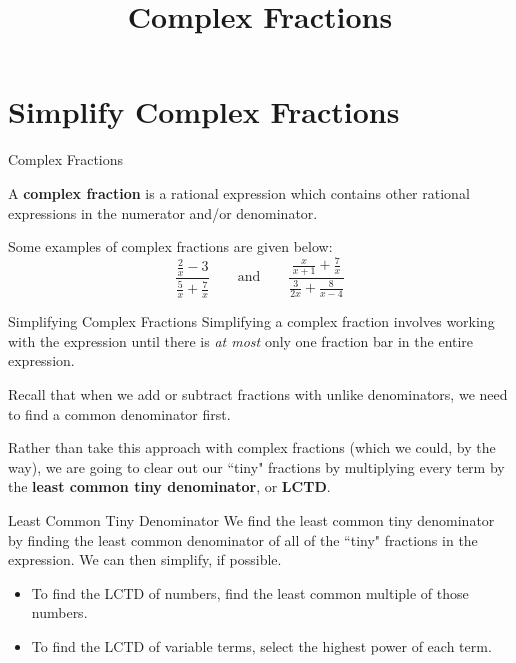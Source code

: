 \documentclass[t]{beamer}
\title{Complex Fractions}
\author{}
\date{}
\begin{document}
\begin{frame} 
\maketitle
\end{frame}

\section{Simplify Complex Fractions}

\begin{frame}{Complex Fractions}
\begin{tcolorbox}[colframe=red!35!blue, colback=white!30!green, title=\textbf{Complex Fraction.}]
A \textbf{complex fraction} is a rational expression which contains other rational expressions in the numerator and/or denominator.
\end{tcolorbox}
\vspace{12pt}	\pause
Some examples of complex fractions are given below:
\[
\frac{\frac{2}{x} - 3}{\frac{5}{x} + \frac{7}{x}}
\qquad \text{and} \qquad
\frac{\frac{x}{x+1} + \frac{7}{x}}{\frac{3}{2x} + \frac{8}{x-4}}
\]
\end{frame}


\begin{frame}{Simplifying Complex Fractions}
Simplifying a complex fraction involves working with the expression until there is \emph{at most} only one fraction bar in the entire expression.   \newline\\	\pause 

Recall that when we add or subtract fractions with unlike denominators, we need to find a common denominator first.    \newline\\	\pause

Rather than take this approach with complex fractions (which we could, by the way), we are going to clear out our ``tiny" fractions by multiplying every term by the {\color{blue}\textbf{least common tiny denominator}}, or {\color{blue}\textbf{LCTD}}.
\end{frame}

\begin{frame}{Least Common Tiny Denominator}
We find the least common tiny denominator by finding the least common denominator of all of the ``tiny" fractions in the expression. We can then simplify, if possible.  	\newline\\	\pause

\begin{itemize}
\item To find the LCTD of numbers, find the least common multiple of those numbers.   \newline\\ \pause
\item To find the LCTD of variable terms, select the highest power of each term.
\end{itemize}
\end{frame}
\end{document}
